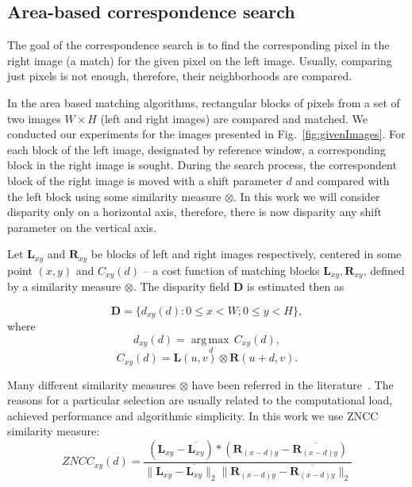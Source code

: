 \documentclass[conference]{IEEEtran}
\newcommand{\argmax}[1]{\underset{#1}{\operatorname{arg\,max\,}}}
\begin{document}
\subsection{Area-based correspondence search}
The goal of the correspondence search is to find the corresponding pixel in the right image (a match) for the given pixel on the left image. Usually, comparing just pixels is not enough, therefore, their neighborhoods are compared.

In the area based matching algorithms, rectangular blocks of pixels from a set of two images $W \times H$ (left and right images) are compared and matched. We conducted our experiments for the images presented in Fig.~\ref{fig:givenImages}. For each block of the left image, designated by reference window, a corresponding block in the right image is sought. During the search process, the correspondent block of the right image is moved with a shift parameter $d$ and compared with the left block using some similarity measure $\otimes$. In this work we will consider disparity only on a horizontal axis, therefore, there is now disparity any shift parameter on the vertical axis.

 Let $\mathbf{L}_{xy}$ and $ \mathbf{R}_{xy}$ be blocks of left and right images respectively, centered in some point $(x, y)$ and $C_{xy}(d)$ -- a cost function of matching blocks $\mathbf{L}_{xy}, \mathbf{R}_{xy}$, defined by a similarity measure $\otimes$. The disparity field $\mathbf{D}$ is estimated then as

\begin{equation}
\mathbf{D} = \{ d_{xy}(d): 0\leq x < W; 0\leq y < H \},
\end{equation}
\noindent where 
\begin{equation}
d_{xy}(d) = \argmax{d}C_{xy}(d),
\end{equation}
\begin{equation}
C_{xy}(d) = \mathbf{L}\left(u,v\right)\otimes \mathbf{R}\left(u+d,v\right).
\end{equation}

Many different similarity measures $\otimes$ have been referred in the literature~\cite{Redert99}. The reasons for a particular selection are usually related to the computational load, achieved performance and algorithmic simplicity. In this work we use ZNCC similarity measure:
\begin{equation}\label{eq:zncc}
ZNCC_{xy}(d)=\frac{\left(\mathbf{L}_{xy}-\overline{\mathbf{L}_{xy}}\right) * \left(\mathbf{R}_{(x-d)y}-\overline{\mathbf{R}_{(x-d)y}}\right)}
{\|\mathbf{L}_{xy}-\overline{\mathbf{L}_{xy}}\|_2 \|\mathbf{R}_{(x-d)y}-\overline{\mathbf{R}_{(x-d)y}}\|_2}
\end{equation}
\end{document}
